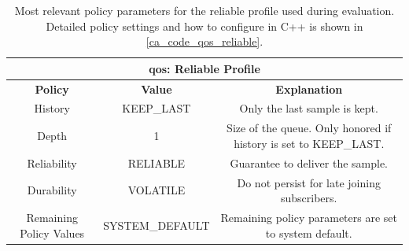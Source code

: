 \begin{table}[H]
    \centering
\begin{tabular}{ |c|c|c| }
\hline
\multicolumn{3}{|c|}{\gls{qos}: Reliable Profile} \\
\hline
\hline
\textbf{Policy} & \textbf{Value} & \textbf{Explanation} \\\hline
    History & KEEP\_LAST &  
        \begin{minipage}{6cm}
	       \vspace{8pt}
		      Only the last sample is kept.
	       \vspace{8pt}
	    \end{minipage} \\\hline
    Depth & 1 &  
        \begin{minipage}{6cm}
	       \vspace{8pt}
            Size of the queue. Only honored if history is set to KEEP\_LAST.
	       \vspace{8pt}
	    \end{minipage} \\\hline
    Reliability & RELIABLE &  
        \begin{minipage}{6cm}
	       \vspace{8pt}
		      Guarantee to deliver the sample.
	       \vspace{8pt}
	    \end{minipage} \\\hline
    Durability & VOLATILE & 
        \begin{minipage}{6cm}
	       \vspace{8pt}
		      Do not persist for late joining subscribers.
	       \vspace{8pt}
	    \end{minipage} \\\hline
    Remaining Policy Values & SYSTEM\_DEFAULT & 
        \begin{minipage}{6cm}
	       \vspace{8pt}
		      Remaining policy parameters are set to system default.
	       \vspace{8pt}
	    \end{minipage} \\\hline
\end{tabular}
    \caption{Most relevant policy parameters for the reliable profile used during evaluation. Detailed policy settings and how to configure in C++ is shown in \autoref{ca_code_qos_reliable}.}
    \label{c6_tab_reliable_qos}
\end{table}
